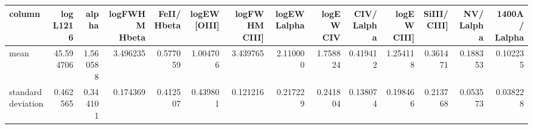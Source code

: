 \begin{tabular}{lrrrrrrrrrrrrr}
\toprule
             column &  log L1216 &     alpha &  logFWHM Hbeta  &  FeII/ Hbeta  &  logEW [OIII] &  logFWHM CIII] &  logEW Lalpha &  logEW CIV &  CIV/ Lalpha &  logEW CIII] &  SiIII/ CIII] &  NV/ Lalpha &  1400A/ Lalpha \\
\midrule
               mean &  45.594706 &  1.560588 &        3.496235 &      0.577059 &      1.004706 &       3.439765 &      2.110000 &   1.758824 &     0.419412 &     1.254118 &      0.361471 &    0.188353 &       0.102235 \\
 standard deviation &   0.462565 &  0.344101 &        0.174369 &      0.412507 &      0.439801 &       0.121216 &      0.217229 &   0.241804 &     0.138074 &     0.198466 &      0.213768 &    0.053573 &       0.038228 \\
\bottomrule
\end{tabular}
